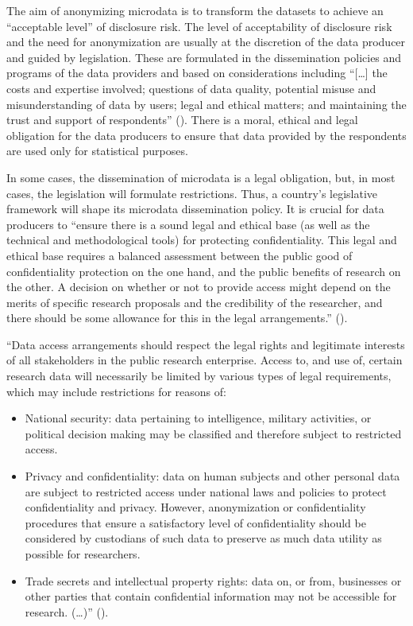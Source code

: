 \documentclass[letterpaper,10pt,english]{sphinxmanual}
\begin{document}
The aim of anonymizing microdata is to transform the datasets to achieve
an “acceptable level” of disclosure risk. The level of acceptability of
disclosure risk and the need for anonymization are usually at the
discretion of the data producer and guided by legislation. These are
formulated in the dissemination policies and programs of the data
providers and based on considerations including “{[}…{]} the costs and
expertise involved; questions of data quality, potential misuse and
misunderstanding of data by users; legal and ethical matters; and
maintaining the trust and support of respondents” ({\hyperref[\detokenize{SDC_intro:dubo10}]{}}).
There is a moral, ethical and legal obligation for the data
producers to ensure that data provided by the respondents are used only
for statistical purposes.

In some cases, the dissemination of microdata is a legal obligation,
but, in most cases, the legislation will formulate restrictions. Thus, a
country’s legislative framework will shape its microdata dissemination
policy. It is crucial for data producers to “ensure there is a sound
legal and ethical base (as well as the technical and methodological
tools) for protecting confidentiality. This legal and ethical base
requires a balanced assessment between the public good of
confidentiality protection on the one hand, and the public benefits of
research on the other. A decision on whether or not to provide access
might depend on the merits of specific research proposals and the
credibility of the researcher, and there should be some allowance for
this in the legal arrangements.” ({\hyperref[\detokenize{SDC_intro:dubo10}]{}}).

“Data access arrangements should respect the legal rights and legitimate
interests of all stakeholders in the public research enterprise. Access
to, and use of, certain research data will necessarily be limited by
various types of legal requirements, which may include restrictions for
reasons of:
\begin{itemize}
\item {} 
National security: data pertaining to intelligence, military
activities, or political decision making may be classified and
therefore subject to restricted access.

\item {} 
Privacy and confidentiality: data on human subjects and other
personal data are subject to restricted access under national laws
and policies to protect confidentiality and privacy. However,
anonymization or confidentiality procedures that ensure a
satisfactory level of confidentiality should be considered by
custodians of such data to preserve as much data utility as possible
for researchers.

\item {} 
Trade secrets and intellectual property rights: data on, or from,
businesses or other parties that contain confidential information may
not be accessible for research. (…)” ({\hyperref[\detokenize{SDC_intro:dubo10}]{}}).

\end{itemize}
\end{document}
